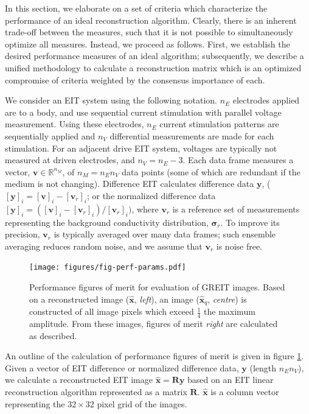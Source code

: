 \documentclass[12pt]{iopart}
\newcommand{\vB}{\mbox{$\mathbf{v}$}}
\newcommand{\xH}{\mbox{$\mathbf{\hat x}$}}
\newcommand{\yB}{\mbox{$\mathbf{y}$}}
\newcommand{\RB}{\mbox{$\mathbf{R}$}}
\newcommand{\sG}{\mbox{${\boldsymbol \sigma}$}}
\begin{document}
In this section, we elaborate on a set of criteria which 
characterize the performance of an ideal reconstruction
algorithm. Clearly, there is an inherent trade-off between
the measures, such that it is not possible to 
simultaneously optimize all measures. Instead, we proceed
as follows. First, we establish the desired performance measures
of an ideal algorithm; subsequently, 
we describe a unified methodology to calculate a reconstruction
matrix which is an optimized compromise of criteria
weighted by the consensus importance of each.  

We consider an EIT system using the following notation.
$n_E$ electrodes applied are to a body, and use
sequential current stimulation with parallel voltage
measurement. Using these electrodes, $n_E$ current stimulation
patterns are sequentially applied and $n_V$ differential
measurements are made for each stimulation.  For an adjacent drive
EIT system, voltages are typically not measured at driven
electrodes, and $n_V = n_E - 3$.  Each data frame measures
a vector, $\vB\in\mathbb{R}^{n_M}$, of $n_M= n_E n_V$ data points
(some of which are redundant if the medium is not changing).
Difference EIT calculates difference data $\yB$, ($[\yB]_i =
[\vB]_i - [\vB_r]_i$; or the normalized difference data $[\yB]_i
= ([\vB]_i - [\vB_r]_i)/[\vB_r]_i)$, where $\vB_r$ is a reference
set of measurements representing the background conductivity
distribution, $\sG_r$. To improve its precision,
$\vB_r$ is typically averaged over many data frames; 
such ensemble averaging reduces random noise, and we
 assume that $\vB_r$ is noise free.



\begin{figure}[bhtp]
\begin{center}
\texttt{[image: figures/fig-perf-params.pdf]}
\caption{ \label{fig:PerfFigures}
Performance figures of merit for evaluation of GREIT images.
Based on a reconstructed image ($\xH$, {\em left}),
an image ($\xH_q$, {\em centre})
is constructed of all image pixels which exceed
 $\frac{1}{4}$ the maximum amplitude. From these images,
figures of merit {\em right} are calculated as described.
}
\end{center}
\end{figure}

An outline of the calculation of performance figures
of merit is given in figure \ref{fig:PerfFigures}.
Given a vector of EIT difference or normalized difference
data, $\yB$ (length $n_E n_V$), we calculate a 
reconstructed EIT image $\xH = \RB \yB$ based on
an EIT linear reconstruction algorithm represented as
a matrix $\RB$. $\xH$ is a column vector representing
the $32\times 32$ pixel grid of the images.
\end{document}
